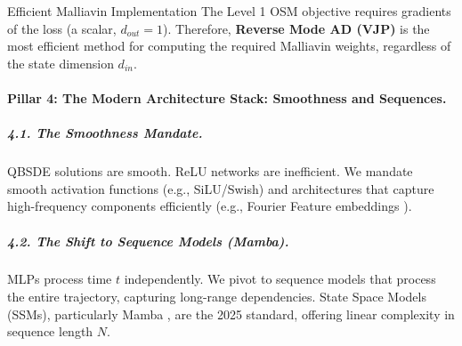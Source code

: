 \begin{figure}[ht]
\captionsetup{hypcap=false}
\label{fig:AD_Geometry_R3}
\end{figure}

\begin{distillresult}{Efficient Malliavin Implementation}
The Level 1 OSM objective requires gradients of the loss (a scalar, $d_{out}=1$). Therefore, \textbf{Reverse Mode AD (VJP)} is the most efficient method for computing the required Malliavin weights, regardless of the state dimension $d_{in}$.
\end{distillresult}

\paragraph{Pillar 4: The Modern Architecture Stack: Smoothness and Sequences.}

\subparagraph{4.1. The Smoothness Mandate.}
QBSDE solutions are smooth. ReLU networks are inefficient. We mandate smooth activation functions (e.g., SiLU/Swish) and architectures that capture high-frequency components efficiently (e.g., Fourier Feature embeddings \cite{Tancik2020}).

\subparagraph{4.2. The Shift to Sequence Models (Mamba).}
MLPs process time $t$ independently. We pivot to sequence models that process the entire trajectory, capturing long-range dependencies. State Space Models (SSMs), particularly Mamba \cite{GuDao2024_Mamba}, are the 2025 standard, offering linear complexity in sequence length $N$.

